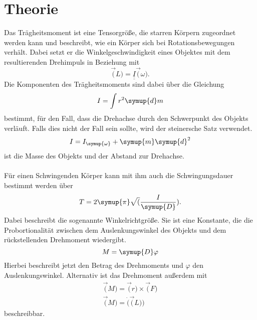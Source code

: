 \section{Theorie}
\label{sec:Theorie}
Das Trägheitsmoment  ist eine Tensorgröße, die starren Körpern zugeordnet werden kann und 
beschreibt, wie ein Körper sich bei Rotationsbewegungen verhält.
Dabei setzt er die Winkelgeschwindigkeit eines Objektes mit dem resultierenden Drehimpuls in Beziehung mit
\begin{equation}
    \vec(L)=\underline{\underline{I}} \vec(\omega) \text{.}
    \label{eqn:Dreh1}
\end{equation}
Die Komponenten des Trägheitsmoments  sind dabei über die Gleichung
\begin{equation}
    I=\int r^2 \symup{d}m
    \label{eqn:Trägheit}
\end{equation}
bestimmt, für den Fall, dass die Drehachse durch den Schwerpunkt des Objekts verläuft. 
Falls dies nicht der Fall sein sollte, wird der steinersche Satz verwendet.
\begin{equation}
    I=I_{\symup{\omega}}+\symup{m} \symup{d}^2
    \label{eqn:Steiner}
\end{equation}   
 ist die Masse des Objekts und  der Abstand zur Drehachse. \\
\\
Für einen Schwingenden Körper kann mit ihm auch die Schwingungsdauer bestimmt werden über
\begin{equation}
    T=2 \symup{\pi} \sqrt(\frac{I}{\symup{D}})\text{.}
    \label{eqn:Schwingungsdauer}
\end{equation}
Dabei beschreibt  die sogenannte Winkelrichtgröße. Sie ist eine Konstante, die die Probortionalität zwischen dem 
Auslenkungswinkel des Objekts und dem rückstellenden Drehmoment wiedergibt.
\begin{equation}
    M=\symup{D} \varphi %
    \label{eqn:Drehmom1}
\end{equation} 
Hierbei beschreibt  jetzt den Betrag des Drehmoments und $\varphi$ den Auslenkungswinkel.
Alternativ ist das Drehmoment außerdem mit
\begin{equation}
    \begin{gather}
        \vec(M)=\vec(r) \times \vec(F) \\ \vec(M)=\dot(\vec(L))
    \end{gather}
    \label{eqn:Drehmom2}
\end{equation}
beschreibbar.

